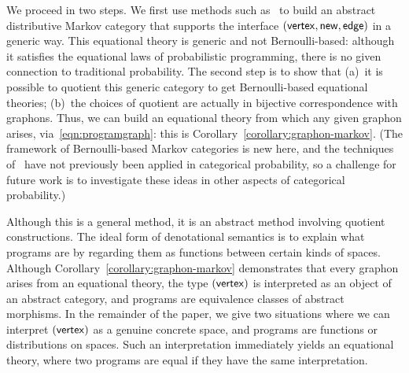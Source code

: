 We proceed in two steps. We first use methods such as~\cite{hermida-tennent,hu-tholen}
to build an abstract distributive
Markov category that supports the interface
$(\mathsf{vertex},\mathsf{new},\mathsf{edge})$ in a generic way. This equational theory is
generic and not Bernoulli-based: although it satisfies the equational laws of
probabilistic programming, there is no given connection to traditional probability.
The second step is to  show that (a)~it is possible to quotient this generic category
to get Bernoulli-based equational theories; (b)~the choices of
quotient are actually in bijective correspondence with graphons.
Thus, we can build an equational theory from which any given graphon arises,
via~\eqref{eqn:programgraph}: this is Corollary~\ref{corollary:graphon-markov}.
(The framework of Bernoulli-based Markov categories is new here, and the techniques of~\cite{hermida-tennent,hu-tholen}  have not previously been applied in categorical probability, so
a challenge for future work is to investigate these ideas in other aspects of categorical probability.)

Although this is a general method,
it is an abstract method involving quotient constructions. 
The ideal form of denotational semantics is to explain what programs are by regarding them as
functions between certain kinds of spaces. Although Corollary~\ref{corollary:graphon-markov} demonstrates
that every graphon arises from an equational theory, the type
$(\mathsf{vertex})$ is interpreted as an object of an abstract category, and
programs are equivalence classes of abstract morphisms.
In the remainder of the paper, we give two situations where we can
interpret $(\mathsf{vertex})$ as a genuine concrete space, and programs are
functions or distributions on spaces. Such an interpretation
immediately yields an equational theory, where two programs are
equal if they have the same interpretation.

